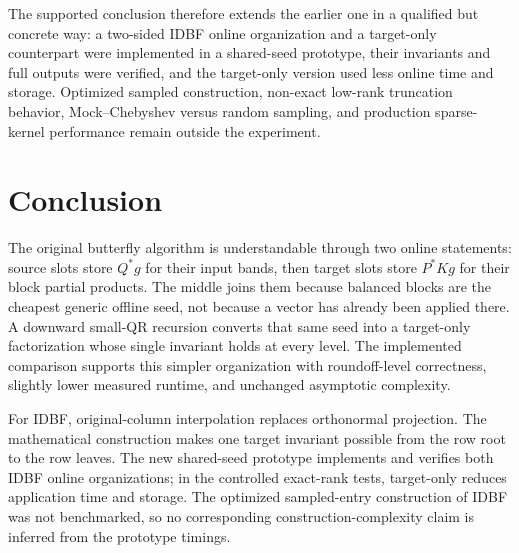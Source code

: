 \documentclass[11pt]{article}
\begin{document}
The supported conclusion therefore extends the earlier one in a qualified but concrete way: a two-sided IDBF online organization and a target-only counterpart were implemented in a shared-seed prototype, their invariants and full outputs were verified, and the target-only version used less online time and storage.  Optimized sampled construction, non-exact low-rank truncation behavior, Mock--Chebyshev versus random sampling, and production sparse-kernel performance remain outside the experiment.

\section{Conclusion}

The original butterfly algorithm is understandable through two online statements: source slots store $Q^*g$ for their input bands, then target slots store $P^*Kg$ for their block partial products.  The middle joins them because balanced blocks are the cheapest generic offline seed, not because a vector has already been applied there.  A downward small-QR recursion converts that same seed into a target-only factorization whose single invariant holds at every level.  The implemented comparison supports this simpler organization with roundoff-level correctness, slightly lower measured runtime, and unchanged asymptotic complexity.

For IDBF, original-column interpolation replaces orthonormal projection.  The mathematical construction makes one target invariant possible from the row root to the row leaves.  The new shared-seed prototype implements and verifies both IDBF online organizations; in the controlled exact-rank tests, target-only reduces application time and storage.  The optimized sampled-entry construction of IDBF was not benchmarked, so no corresponding construction-complexity claim is inferred from the prototype timings.
\end{document}
